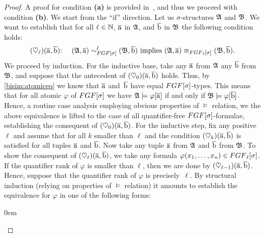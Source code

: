 
\begin{proof}
  A proof for condition \textbf{(a)} is provided in~\cite[Lemma 3]{BednarczykJ22}, and thus we proceed with condition \textbf{(b)}.
  We start from the ``if'' direction. 
  Let us $\sigma$-structures ${\mathfrak{A}}$ and ${\mathfrak{B}}$.
  We want to establish that for all $\ell \in {\mathbb{N}}$, $\overline{\mathrm{a}}$ in ${\mathfrak{A}}$, and $\overline{\mathrm{b}}$ in ${\mathfrak{B}}$ the following condition holds:
  \[
    (\heartsuit_\ell)(\elemtuplea, \elemtupleb){:} \ \ \ \  (\str{A}, \elemtuplea) \bisimto_{\FGF[\sigma]}^{\ell} (\str{B}, \elemtupleb) \ \text{implies} \ (\str{A}, \elemtuplea) \equiv_{\FGF_\ell[\sigma]} (\str{B}, \elemtupleb).
  \]
  We proceed by induction. 
  For the inductive base, take any $\overline{\mathrm{a}}$ from ${\mathfrak{A}}$ any $\overline{\mathrm{b}}$ from ${\mathfrak{B}}$, and suppose that the antecedent of $(\heartsuit_0)(\overline{\mathrm{a}},\overline{\mathrm{b}})$ holds.
  Thus, by \ref{bisim:atomiceq} we know that $\overline{\mathrm{a}}$ and~$\overline{\mathrm{b}}$ have equal $\FGF[\sigma]$-types.
  This means that for all atomic $\varphi$ of $\FGF[\sigma]$ we have ${\mathfrak{A}} \models \varphi[\overline{\mathrm{a}}]$ if and only if ${\mathfrak{B}} \models \varphi[\overline{\mathrm{b}}]$.
  Hence, a routine case analysis employing obvious properties of $\models$ relation, we the above equivalence is lifted to the case of all quantifier-free $\FGF[\sigma]$-formulae, establishing the consequent of $(\heartsuit_0)(\overline{\mathrm{a}},\overline{\mathrm{b}})$.
  For the inductive step, fix any positive $\ell$ and assume that for all $k$ smaller than $\ell$ and the condition $(\heartsuit_k)(\overline{\mathrm{a}},\overline{\mathrm{b}})$ is satisfied for all tuples $\overline{\mathrm{a}}$ and $\overline{\mathrm{b}}$.
  Now take any tuple $\overline{\mathrm{a}}$ from ${\mathfrak{A}}$ and $\overline{\mathrm{b}}$ from ${\mathfrak{B}}$.
  To show the consequent of $(\heartsuit_\ell)(\overline{\mathrm{a}},\overline{\mathrm{b}})$, we take any formula $\varphi(x_1, \ldots, x_n) \in \FGF_\ell[\sigma]$.
  If the quantifier rank of $\varphi$ is smaller than $\ell$, then we are done by $(\heartsuit_{\ell{-}1})(\overline{\mathrm{a}},\overline{\mathrm{b}})$.
  Hence, suppose that the quantifier rank of $\varphi$ is precisely~$\ell$.
  By structural induction (relying on properties of $\models$ relation) it amounts to establish the equivalence for $\varphi$ in one of the following forms: 
  \begin{itemize}\itemsep0em


\end{itemize}
\end{proof}
